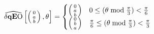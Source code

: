 \begin{equation}\label{eq:abPerturbationFunctionOrdering}
\dqEO[  \left(
\begin{smallmatrix}
 0   \\
 a   \\
 b  \\
 \end{smallmatrix} 
\right)  ,\theta ] =
\begin{cases}
 \left(
\begin{smallmatrix}
 0 \\
 a  \\
 b \\
\end{smallmatrix} 
\right) & 0\leq (\theta  \bmod \frac{\pi}{3} )<\frac{\pi }{6} \\
 \left(
\begin{smallmatrix}
 0 \\
 b  \\
 a \\
\end{smallmatrix} 
\right) & \frac{\pi }{6} \leq (\theta  \bmod \frac{\pi}{3} ) < \frac{\pi }{3} 
\end{cases}
\end{equation}

